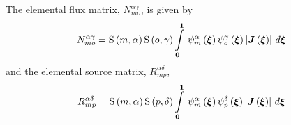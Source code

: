 The elemental flux matrix, $N^{\alpha\gamma}_{mo}$, is given by
\begin{equation}
  N^{\alpha\gamma}_{mo} =\gsf{m}{\alpha}\gsf{o}{\gamma}
  \gint{\vectr{0}}{\vectr{1}}{\gbfn{m}{\alpha}{\vectr{\xi}}\gbfn{o}{\gamma}{\vectr{\xi}}
    \abs{\fnof{\matr{J}}{\vectr{\xi}}}}{\vectr{\xi}}
\end{equation}
and the elemental source matrix, $R^{\alpha\delta}_{mp}$, 
\begin{equation}
  R^{\alpha\delta}_{mp}=\gsf{m}{\alpha}\gsf{p}{\delta}
  \gint{\vectr{0}}{\vectr{1}}{\gbfn{m}{\alpha}{\vectr{\xi}}\gbfn{p}{\delta}{\vectr{\xi}}
    \abs{\fnof{\matr{J}}{\vectr{\xi}}}}{\vectr{\xi}}
\end{equation}

